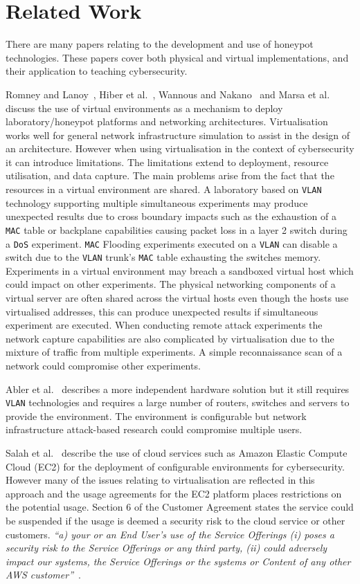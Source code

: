 \documentclass{ieeeaccess}
\begin{document}
\section{Related Work}\label{sec:RelatedWork}
There are many papers relating to the development and use of honeypot technologies. These papers cover both physical and virtual implementations, and their application to teaching cybersecurity. 

Romney and Lanoy~\cite{LR:06}, Hiber et al.~\cite{HRS:08}, Wannous and Nakano~\cite{WN:10} and Marsa et al.~\cite{MGDL:13} discuss the use of virtual environments as a mechanism to deploy laboratory/honeypot platforms and networking architectures. Virtualisation works well for general network infrastructure simulation to assist in the design of an architecture. However when using virtualisation in the context of cybersecurity it can introduce limitations. The limitations extend to deployment, resource utilisation, and data capture. The main problems arise from the fact that the resources in a virtual environment are shared. A laboratory based on \texttt{VLAN} technology supporting multiple simultaneous experiments may produce unexpected results due to cross boundary impacts such as the exhaustion of a \texttt{MAC} table or backplane capabilities causing packet loss in a layer 2 switch during a \texttt{DoS} experiment. \texttt{MAC} Flooding experiments executed on a \texttt{VLAN} can disable a switch due to the \texttt{VLAN} trunk's \texttt{MAC} table exhausting the switches memory. Experiments in a virtual environment may breach a sandboxed virtual host which could impact on other experiments. The physical networking components of a virtual server are often shared across the virtual hosts even though the hosts use virtualised addresses, this can produce unexpected results if simultaneous experiment are executed. When conducting remote attack experiments the network capture capabilities are also complicated by virtualisation due to the mixture of traffic from multiple experiments. A simple reconnaissance scan of a network could compromise other experiments.

Abler et al.~\cite{ACG:06} describes a more independent hardware solution but it still requires \texttt{VLAN} technologies and requires a large number of routers, switches and servers to provide the environment. The environment is configurable but network infrastructure attack-based research could compromise multiple users.

Salah et al.~\cite{SHZ:15} describe the use of cloud services such as Amazon Elastic Compute Cloud (EC2) for the deployment of configurable environments for cybersecurity. However many of the issues relating to virtualisation are reflected in this approach and the usage agreements for the EC2 platform places restrictions on the potential usage. Section 6 of the Customer Agreement states the service could be suspended if the usage is deemed a security risk to the cloud service or other customers. \textit{``a) your or an End User’s use of the Service Offerings (i) poses a security risk to the Service Offerings or any third party, (ii) could adversely impact our systems, the Service Offerings or the systems or Content of any other AWS customer''}~\cite{AWS:18}.
\end{document}
